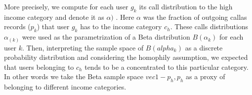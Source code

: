 More precisely, we compute for each user $g_k$ its call distribution to the high income category and denote it as $\alpha)$ . Here $\alpha$ was the fraction of outgoing callas records ($p_k$) that user $g_k$ has to the income category $c_h$. These calls distributions $\alpha_{(k)}$ were used as the parametrization of a Beta distribution $B(\alpha_k)$ for each user $k$. Then, interpreting the sample space of $B(alpha_k)$ as a discrete probability distribution and considering the homophily assumption,  we expected that users belonging to $c_h$ tends to be a concentrated to this particular category. In other words we take the Beta sample space $vec{1-p_h,p_h}$ as a proxy of belonging to different income categories.
\\

